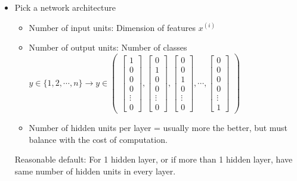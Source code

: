 \begin{itemize}
\item
Pick a network architecture
    \begin{itemize}
    \item
    Number of input units: Dimension of features $x^{(i)}$
    \item
    Number of output units: Number of classes\\
    $y \in \{1, 2, \cdots, n\} \rightarrow y \in \begin{pmatrix}
    \begin{bmatrix} 1\\ 0\\ 0\\ 0 \\ \vdots \\ 0\end{bmatrix}, \begin{bmatrix} 0\\ 1\\ 0\\ 0 \\  \vdots \\ 0\end{bmatrix}, \begin{bmatrix} 0\\ 0\\ 1\\ 0 \\  \vdots \\ 0 \end{bmatrix}, \cdots, \begin{bmatrix} 0\\ 0\\ 0\\ 0 \\  \vdots \\ 1 \end{bmatrix}
    \end{pmatrix}$
    \item
    Number of hidden units per layer = usually more the better, but must balance with the cost of computation.
    \end{itemize}
Reasonable default: For 1 hidden layer, or if more than 1 hidden layer, have same number of hidden units in every layer.


\end{itemize}
